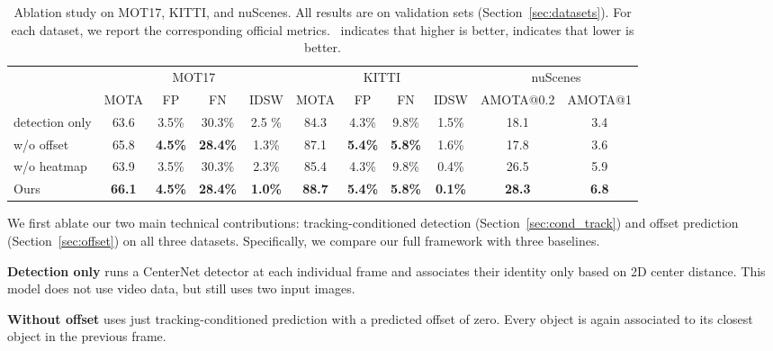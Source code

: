 \documentclass[runningheads]{llncs}
\newcommand{\lbltab}[1]{\label{tbl:#1}}
\newcommand{\refsec}[1]{Section~\ref{sec:#1}}
\renewcommand{\paragraph}[1]{\noindent\textbf{#1}}
\begin{document}
\begin{table}[t]
{\center 
\small
\begin{tabular}{@{}l@{\ }c@{\ \ }c@{\ \ }c@{\ }c@{\ \ }c@{\ \ }c@{\ }c@{\ }c@{\ }c@{}c@{}}
\toprule
 & \multicolumn{4}{c}{MOT17} & \multicolumn{4}{c}{KITTI} & \multicolumn{2}{c}{nuScenes}\\
 & {\scriptsize MOTA} & {\scriptsize FP} & {\scriptsize FN} & {\scriptsize IDSW} & {\scriptsize MOTA}  & {\scriptsize FP} & {\scriptsize FN} & {\scriptsize IDSW} & {\scriptsize AMOTA@0.2} & {\scriptsize AMOTA@1} \\
\cmidrule(r){1-1}
\cmidrule(r){2-5}
\cmidrule(r){6-9}
\cmidrule(){10-11}
detection only & 63.6 & 3.5\% & 30.3\% & 2.5 \%
& 84.3  & 4.3\% & 9.8\% & 1.5\% & 18.1 & 3.4 \\
w/o offset & 65.8 & \textbf{4.5\%} & \textbf{28.4\%} & 1.3\% 
& 87.1 & \textbf{5.4\%} & \textbf{5.8\%} & 1.6\% & 17.8 & 3.6 \\
w/o heatmap & 63.9 & 3.5\% & 30.3\% & 2.3\%
& 85.4 & 4.3\% & 9.8\% & 0.4\% & 26.5 & 5.9\\
Ours & \textbf{66.1} & \textbf{4.5\%} & \textbf{28.4\%} & \textbf{1.0\%} 
& \textbf{88.7} & \textbf{5.4\%} & \textbf{5.8\%} & \textbf{0.1\%} & \textbf{28.3} & \textbf{6.8} \\
\bottomrule
\end{tabular}
\small
\caption{Ablation study on MOT17, KITTI, and nuScenes. All results are on validation sets (\refsec{datasets}). For each dataset, we report the corresponding official metrics. ~indicates that higher is better,  indicates that lower is better.}
\lbltab{ablation}
}
\vspace{-7mm}
\end{table}

We first ablate our two main technical contributions: tracking-conditioned detection (\refsec{cond_track}) and offset prediction (\refsec{offset}) on all three datasets.
Specifically, we compare our full framework with three baselines.

\paragraph{Detection only} runs a CenterNet detector at each individual frame and associates their identity only based on 2D center distance. 
This model does not use video data, but still uses two input images.

\paragraph{Without offset} uses just tracking-conditioned prediction with a predicted offset of zero. Every object is again associated to its closest object in the previous frame.
\end{document}
